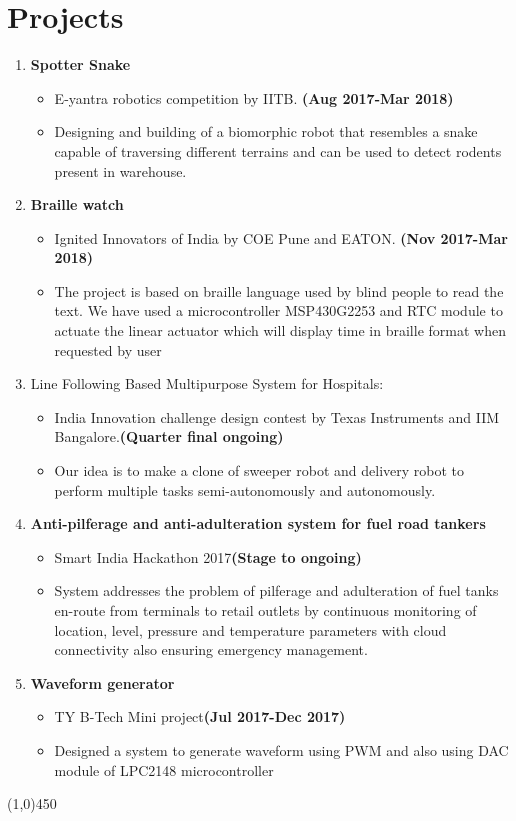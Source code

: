 \documentclass[10pt]{article}
\begin{document}
\section{Projects}
\begin{enumerate}
	\item\textbf{ Spotter Snake}
	\begin{itemize}
		\item E-yantra robotics
		competition by IITB.
		\textbf{(Aug 2017-Mar 2018)}
		\item Designing and building of a biomorphic robot that
		resembles a snake capable of traversing different
		terrains and can be used to detect rodents present in
		warehouse.
	\end{itemize}
	\item \textbf{Braille watch}
	\begin{itemize}
		\item Ignited Innovators of India by COE Pune and EATON. \textbf{(Nov 2017-Mar 2018)}
		\item The project is based on braille language used by blind people to read the text. We have used a microcontroller MSP430G2253 and RTC module to actuate the linear actuator which will display time in braille format when requested by user
	\end{itemize}
	\item Line Following Based Multipurpose System for Hospitals:
	\begin{itemize}
		\item India Innovation challenge design contest by Texas Instruments and IIM Bangalore.\textbf{(Quarter final ongoing)}
		\item Our idea is to make a clone of sweeper robot and delivery robot to perform multiple tasks semi-autonomously and autonomously.
	\end{itemize}
	\item \textbf{ Anti-pilferage and anti-adulteration system for fuel road tankers}
	\begin{itemize}
		\item Smart India Hackathon 2017\textbf{(Stage to ongoing)}
		\item System addresses the problem of pilferage and adulteration of fuel tanks en-route from terminals to retail outlets by continuous monitoring of location, level, pressure and temperature parameters with cloud connectivity also ensuring emergency management.
	\end{itemize}
	\item\textbf{ Waveform generator}
	\begin{itemize}
		\item TY B-Tech Mini project\textbf{(Jul 2017-Dec 2017)}
		\item Designed a system to generate waveform using PWM and also using DAC module of LPC2148 microcontroller
	\end{itemize}
\end{enumerate}
\begin{center}
	\line(1,0){450}
\end{center}
\end{document}
